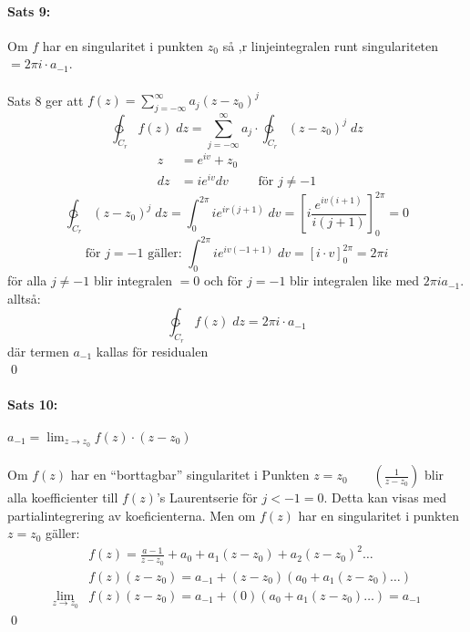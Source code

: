 \documentclass{article}
\begin{document}
\paragraph{Sats 9:}
Om $f$ har en singularitet i punkten $z_0$ så ,r linjeintegralen runt singulariteten $= 2 \pi i \cdot a_{-1}$.\\
\\
Sats 8 ger att $f(z) = \sum\limits_{j = - \infty}^\infty a_j (z - z_0)^j$
\[
	\ointctrclockwise_{C_r} f(z) \; dz = \sum_{j = - \infty}^\infty a_j \cdot \ointctrclockwise_{C_r} (z - z_0)^j \; dz
\]
\begin{align*}
	z &= e^{iv} + z_0 \\
	dz &= ie^{iv} dv \qquad \text{ för } j \neq - 1
\end{align*}
\[
	\ointctrclockwise_{C_r} (z - z_0)^j \; dz = \int_0^{2 \pi} ie^{ir(j + 1)} \; dv =
	\left [
		i \frac {e^{iv(i + 1)}} {i (j + 1)}
	\right ]_0^{2 \pi}
	= 0
\]
\[
	\text{för } j = -1 \text{ gäller: } \int_0^{2\pi} ie^{iv(-1 + 1)} \; dv = 
	\left [
		i \cdot v
	\right ]_0^{2\pi}
	= 2 \pi i
\]
för alla $j \neq -1$ blir integralen $ = 0$ och för $j = -1$ blir integralen like med $2 \pi i a_{- 1}$.
alltså:
\[
	\ointctrclockwise_{C_r} f(z) \; dz = 2 \pi i \cdot a_{-1}
\]
där termen $a_{-1}$ kallas för residualen \\
\hfill \qed

\paragraph{Sats 10:} $a_{-1} = \lim_{z \to z_0} f(z) \cdot (z - z_0)$\\
\\
Om $f(z)$ har en ``borttagbar'' singularitet i Punkten $z = z_0 \qquad \left ( \frac {1} {z - z_0} \right )$ blir 
alla koefficienter till $f(z)$'s Laurentserie för $j < -1 = 0$. Detta kan visas med partialintegrering av koeficienterna.
Men om $f(z)$ har en singularitet i punkten $z = z_0$ gäller:
\begin{align*}
	&f(z) = \frac {a - 1} {z - z_0} + a_0 + a_1(z - z_0) + a_2(z - z_0)^2 \ldots \\
	&f(z) (z - z_0) = a_{-1} + (z - z_0)(a_0 + a_1 (z - z_0) \ldots ) \\
	\lim_{z \to z_0} &f(z)(z - z_0) = a_{- 1} + (0)(a_0 + a_1(z - z_0) \ldots ) = a_{-1}
\end{align*}
\hfill \qed
\\
\end{document}
